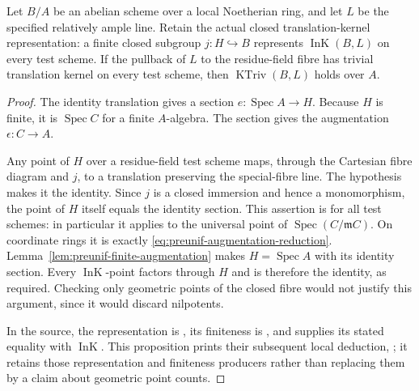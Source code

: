 \begin{srproposition}
\label{prop:preunif-ktriv-local}
Let \(B/A\) be an abelian scheme over a local Noetherian ring,
and let \(L\) be the specified relatively ample line.
Retain the actual closed translation-kernel representation:
a finite closed subgroup \(j:H\hookrightarrow B\) represents
\(\operatorname{InK}(B,L)\) on every test scheme.
If the pullback of \(L\) to the residue-field fibre has trivial
translation kernel on every test scheme, then
\(\operatorname{KTriv}(B,L)\) holds over \(A\).
\end{srproposition}
\begin{proof}
The identity translation gives a section \(e:\operatorname{Spec}A
\to H\).  Because \(H\) is finite, it is \(\operatorname{Spec}C\)
for a finite \(A\)-algebra.  The section gives the augmentation
\(\epsilon:C\to A\).

Any point of \(H\) over a residue-field test scheme maps, through
the Cartesian fibre diagram and \(j\), to a translation preserving
the special-fibre line.  The hypothesis makes it the identity.
Since \(j\) is a closed immersion and hence a monomorphism,
the point of \(H\) itself equals the identity section.
This assertion is for all test schemes: in particular it applies
to the universal point of
\(\operatorname{Spec}(C/\mathfrak mC)\).
On coordinate rings it is exactly
\eqref{eq:preunif-augmentation-reduction}.
Lemma~\ref{lem:preunif-finite-augmentation} makes
\(H=\operatorname{Spec}A\) with its identity section.
Every \(\operatorname{InK}\)-point factors through \(H\) and is
therefore the identity, as required.
Checking only geometric points of the closed fibre would not
justify this argument, since it would discard nilpotents.

In the source, the representation is
, its finiteness is
, and
 supplies its stated equality with
\(\operatorname{InK}\).
This proposition prints their subsequent local deduction,
; it retains those representation
and finiteness producers rather than replacing them by a claim
about geometric point counts.
\end{proof}

